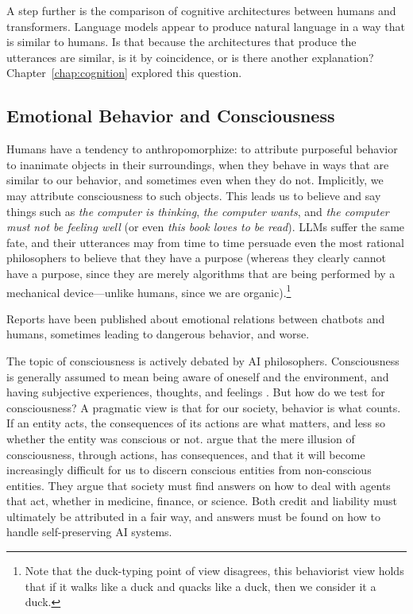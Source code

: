 A step further is the comparison of cognitive architectures between humans and transformers. Language models appear to produce natural language in a way that is similar to humans. Is that because the architectures that produce the utterances are similar, is it by coincidence, or is there another explanation? Chapter~\ref{chap:cognition} explored this question.

\subsection{Emotional Behavior and Consciousness}
Humans have a tendency to anthropomorphize: to attribute purposeful behavior to inanimate objects in their surroundings, when they behave in ways that are similar to our behavior, and sometimes even when they do not. Implicitly, we may attribute consciousness to such objects. This leads us to believe and say things such as {\em the computer is thinking}, {\em the computer wants}, and {\em the computer must not be feeling well} (or even {\em this book loves to be read}). LLMs suffer the same fate, and their utterances may from time to time persuade even the most rational philosophers to believe that they have a purpose (whereas they clearly cannot have a purpose, since they are merely algorithms that are being performed by a mechanical device---unlike humans, since we are organic).\footnote{Note that the duck-typing point of view disagrees, this behaviorist view holds that if it walks like a duck and quacks like a duck, then we consider it a duck.} 

Reports have been published about emotional relations between chatbots and humans, sometimes leading to dangerous behavior, and worse. 

The topic of consciousness is actively debated by AI philosophers. Consciousness is generally assumed to mean being aware of oneself and the environment, and having subjective experiences, thoughts, and feelings \citep{velmans2009understanding,butlin2023consciousness}. But how do we test for consciousness? 
A pragmatic view is that for our society, behavior is what counts. If an entity acts, the consequences of its actions are what matters, and less so whether the entity was conscious or not. \citet{bengio2025illusions} argue that the mere illusion of consciousness, through actions, has consequences, and that it will become increasingly difficult for us to discern  conscious entities from non-conscious entities. They argue that society must find answers on how to deal with agents that act, whether in medicine, finance, or science. Both credit and liability must ultimately be attributed in a fair way, and answers must be found on how to handle self-preserving AI systems. %

